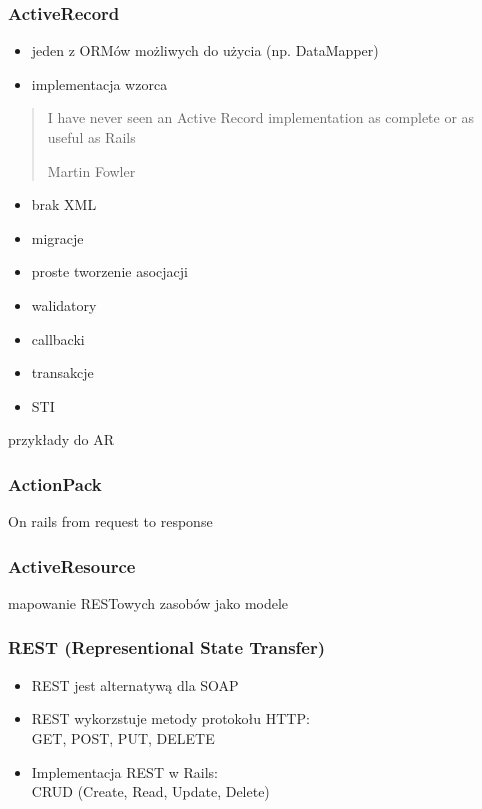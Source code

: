 \documentclass[12t]{beamer}
\begin{document}
\begin{frame}
  \frametitle{ActiveRecord}
  \begin{itemize}
  \item jeden z ORMów możliwych do użycia (np. DataMapper)
  \item implementacja wzorca
  \end{itemize}
\end{frame}

\begin{frame}
  \begin{quote}
    I have never seen an Active Record implementation as complete or as useful as Rails

    \hfill Martin Fowler
  \end{quote}
\end{frame}

\begin{frame}
  \begin{itemize}
  \item brak XML
  \item migracje
  \item proste tworzenie asocjacji
  \item walidatory
  \item callbacki
  \item transakcje
  \item STI
  \end{itemize}
\end{frame}

\begin{frame}
  przykłady do AR
\end{frame}

\begin{frame}
  \frametitle{ActionPack}
  On rails from request to response
\end{frame}

\begin{frame}
  \frametitle{ActiveResource}
  mapowanie RESTowych zasobów jako modele
\end{frame}

\begin{frame}
  \frametitle{REST (Representional State Transfer)}
  	\begin{itemize}
			\item REST jest alternatywą dla SOAP
			\item REST wykorzstuje metody protokołu HTTP:\\
				GET, POST, PUT, DELETE
			\item Implementacja REST w Rails:\\
				CRUD (Create, Read, Update, Delete)
			\end{itemize}
\end{frame}
\end{document}
